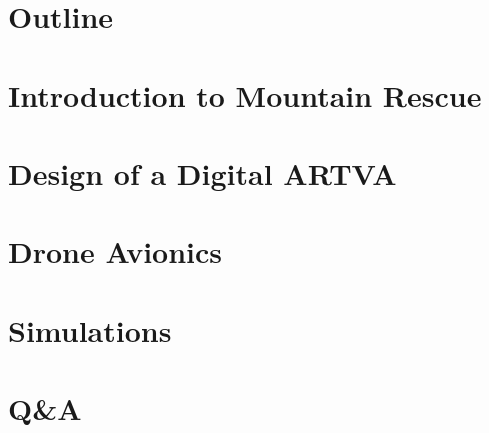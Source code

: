 \documentclass{beamer}
\begin{document}
\section*{Outline}


\section{Introduction to Mountain Rescue}
	\frame{\centering \tableofcontents[currentsection]}
	
	
\section{Design of a Digital ARTVA}
	\frame{\centering \tableofcontents[currentsection]}
	
	
	
	

\section{Drone Avionics}
	\frame{\centering \tableofcontents[currentsection]}
	
	
		
	
	
	
	
	
\section{Simulations}	
	\frame{\centering \tableofcontents[currentsection]}
	
	


\section*{Q\&A}
	
	
	

	
	

	

	
	
\end{document}
